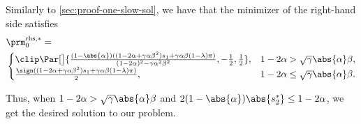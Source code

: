 Similarly to \cref{sec:proof-one-slow-sol}, we have that the minimizer of the
right-hand side satisfies
\[
    \begin{split}
        & \prm^{\text{rhs}, *}_0 =\\
        &
        \begin{cases}
            \clip\Par[\big]{\frac{(1 - \abs{\alpha}) ((1 - 2 \alpha + \gamma
            \alpha \beta^2) s_1 + \gamma \alpha \beta (1 - \lambda) \pi)}{(1
            - 2 \alpha)^2 - \gamma \alpha^2 \beta^2}, -\frac{1}{2},
            \frac{1}{2}},
            & 1 - 2 \alpha > \sqrt{\gamma} \abs{\alpha} \beta,\\
            \frac{\sign((1 - 2 \alpha + \gamma \alpha \beta^2) s_1 + \gamma
            \alpha \beta (1 - \lambda) \pi)}{2},
            & 1 - 2 \alpha \le \sqrt{\gamma} \abs{\alpha} \beta.
        \end{cases}
    \end{split}
\]

Thus, when $1 - 2 \alpha > \sqrt{\gamma} \abs{\alpha} \beta$ and $2 (1 -
\abs{\alpha}) \abs{s^*_2} \le 1 - 2 \alpha$, we get
the desired solution to our problem.



\newpage
